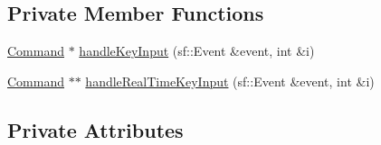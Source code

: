 \subsection*{Private Member Functions}
\begin{DoxyCompactItemize}
\item 
\hyperlink{class_command}{Command} $\ast$ \hyperlink{class_engine_input_handler_a6b350fc8a379b04d36b2a60d4d673dcd}{handle\+Key\+Input} (sf\+::\+Event \&event, int \&i)
\item 
\hyperlink{class_command}{Command} $\ast$$\ast$ \hyperlink{class_engine_input_handler_a7e4a2c1a4cacf7ba3129c1e3a998de53}{handle\+Real\+Time\+Key\+Input} (sf\+::\+Event \&event, int \&i)
\end{DoxyCompactItemize}
\subsection*{Private Attributes}
